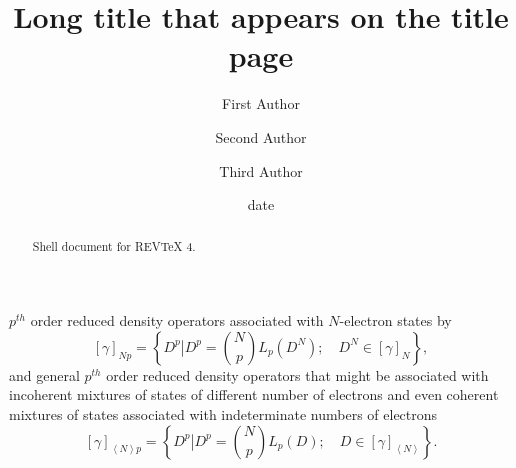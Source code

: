 \documentclass[aps,preprint]{revtex4}%
\begin{document}
\title[Short title for running header]{Long title that appears on the title page}
\author{First Author}
\author{Second Author}
\author{Third Author}

\begin{abstract}
Shell document for REV\TeX{} 4.

\end{abstract}
\date[Date text]{date}




\maketitle
\tableofcontents


$p^{th}$ order reduced density operators associated with $N$-electron states
by
\begin{equation}
\left[  \gamma\right]  _{Np}=\left\{  \left.  D^{p}\right\vert D^{p}=\binom
{N}{p}L_{p}\left(  D^{N}\right)  ;\quad D^{N}\in\left[  \gamma\right]
_{N}\right\}  ,
\end{equation}
and general $p^{th}$ order reduced density operators that might be associated
with incoherent mixtures of states of different number of electrons and even
coherent mixtures of states associated with indeterminate numbers of
electrons
\begin{equation}
\left[  \gamma\right]  _{\left\langle N\right\rangle p}=\left\{  \left.
D^{p}\right\vert D^{p}=\binom{N}{p}L_{p}\left(  D\right)  ;\quad D\in\left[
\gamma\right]  _{\left\langle N\right\rangle }\right\}  .
\end{equation}
\end{document}
